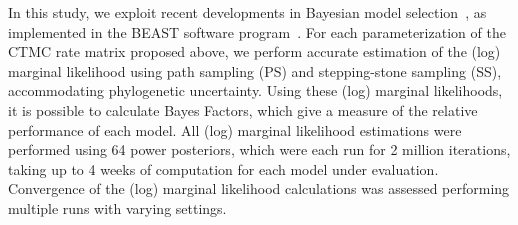\documentclass[10pt]{article}
\begin{document}
In this study, we exploit recent developments in Bayesian model selection~\cite{Baele2012,Baele2013a,Baele2013b}, as implemented in the BEAST software program~\cite{beast2012}.
For each parameterization of the CTMC rate matrix proposed above, we perform accurate estimation of the (log) marginal likelihood using path sampling (PS) and stepping-stone sampling (SS), accommodating phylogenetic uncertainty.
Using these (log) marginal likelihoods, it is possible to calculate Bayes Factors, which give a measure of the relative performance of each model. 
All (log) marginal likelihood estimations were performed using 64 power posteriors, which were each run for 2 million iterations, taking up to 4 weeks of computation for each model under evaluation.
Convergence of the (log) marginal likelihood calculations was assessed performing multiple runs with varying settings.
\end{document}

